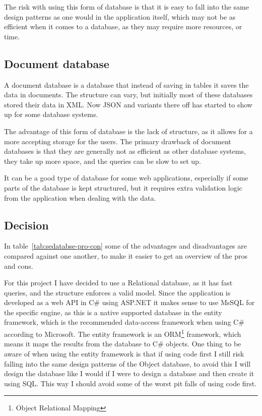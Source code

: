 The risk with using this form of database is that it is easy to fall into the
same design patterns as one would in the application itself, which may not be as
efficient when it comes to a database, as they may require more resources, or
time\cite{ibm:choosing_dbms}. 

\subsection{Document database}
\label{sub:Document database}
A document database is a database that instead of saving in tables it saves the
data in documents. The structure can vary, but initially most of these databases
stored their data in XML\cite{ibm:choosing_dbms}. Now JSON and variants there
off has started to show up for some database systems. 

The advantage of this form of database is the lack of structure, as it allows
for a more accepting storage for the users. The primary drawback of document
databases is that they are generally not as efficient as other database systems,
they take up more space, and the queries can be slow to set
up\cite{ibm:choosing_dbms}. 

It can be a good type of database for some web applications, especially if some
parts of the database is kept structured, but it requires extra validation logic
from the application when dealing with the data. 


\subsection{Decision }
\label{sub:database_decision}
In table~\ref{tab:sedatabse-pro-con} some of the advantages and disadvantages
are compared against one another, to make it easier to get an overview of the
pros and cons. 

For this project I have decided to use a Relational database, as it has fast
queries, and the structure enforces a valid model. Since the application is
developed as a web API in C\# using ASP.NET it makes sense to use MsSQL for the
specific engine, as this is a native supported database in the entity
framework, which is the recommended data-access framework when using C\#
according to Microsoft\cite{entity:microsoft}. The entity framework is an
ORM\footnote{Object Relational Mapping} framework, which means it maps the
results from the database to C\# objects. One thing to be aware of when
using the entity framework is that if using code first I still risk falling into
the same design patterns of the Object database, to avoid this I will design the
database like I would if I were to design a database and then create it
using SQL. This way I should avoid some of the worst pit falls of using code
first.

